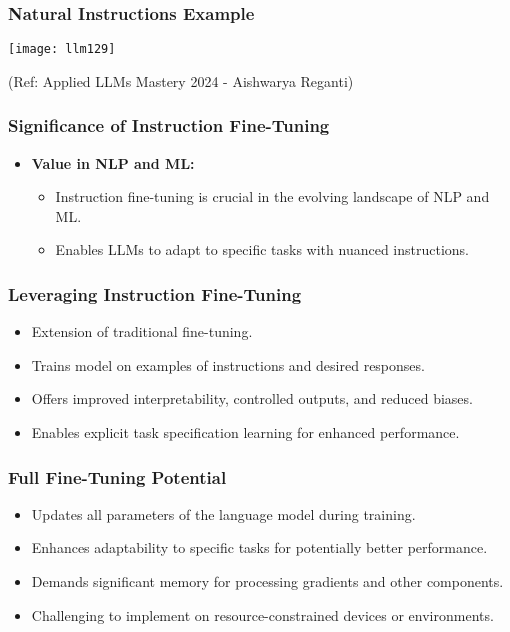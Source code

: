 \begin{frame}[fragile]\frametitle{Natural Instructions Example}

\begin{center}
\texttt{[image: llm129]}
\end{center}				

{\tiny (Ref: Applied LLMs Mastery 2024 - Aishwarya Reganti)}

\end{frame}

\begin{frame}[fragile]\frametitle{Significance of Instruction Fine-Tuning}
  \begin{itemize}
    \item \textbf{Value in NLP and ML:}
      \begin{itemize}
        \item Instruction fine-tuning is crucial in the evolving landscape of NLP and ML.
        \item Enables LLMs to adapt to specific tasks with nuanced instructions.
      \end{itemize}
  \end{itemize}
\end{frame}


\begin{frame}[fragile]\frametitle{Leveraging Instruction Fine-Tuning}
    \begin{itemize}
        \item Extension of traditional fine-tuning.
        \item Trains model on examples of instructions and desired responses.
        \item Offers improved interpretability, controlled outputs, and reduced biases.
        \item Enables explicit task specification learning for enhanced performance.
    \end{itemize}
\end{frame}

\begin{frame}[fragile]\frametitle{Full Fine-Tuning Potential}
    \begin{itemize}
        \item Updates all parameters of the language model during training.
        \item Enhances adaptability to specific tasks for potentially better performance.
        \item Demands significant memory for processing gradients and other components.
        \item Challenging to implement on resource-constrained devices or environments.
    \end{itemize}
\end{frame}


